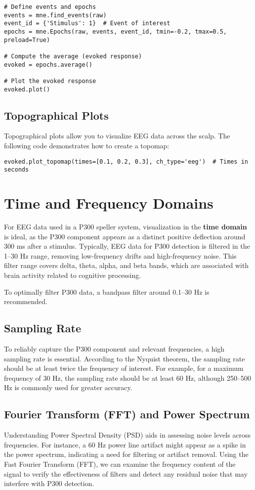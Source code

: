 \documentclass{article}
\begin{document}
\begin{verbatim}
# Define events and epochs
events = mne.find_events(raw)
event_id = {'Stimulus': 1}  # Event of interest
epochs = mne.Epochs(raw, events, event_id, tmin=-0.2, tmax=0.5, preload=True)

# Compute the average (evoked response)
evoked = epochs.average()

# Plot the evoked response
evoked.plot()
\end{verbatim}

\subsection{Topographical Plots}
Topographical plots allow you to visualize EEG data across the scalp. The following code demonstrates how to create a topomap:

\begin{verbatim}
evoked.plot_topomap(times=[0.1, 0.2, 0.3], ch_type='eeg')  # Times in seconds
\end{verbatim}


\section{Time and Frequency Domains}
For EEG data used in a P300 speller system, visualization in the \textbf{time domain} is ideal, as the P300 component appears as a distinct positive deflection around 300 ms after a stimulus. Typically, EEG data for P300 detection is filtered in the 1–30 Hz range, removing low-frequency drifts and high-frequency noise. This filter range covers delta, theta, alpha, and beta bands, which are associated with brain activity related to cognitive processing.

To optimally filter P300 data, a bandpass filter around 0.1–30 Hz is recommended.

\subsection{Sampling Rate}
To reliably capture the P300 component and relevant frequencies, a high sampling rate is essential. According to the Nyquist theorem, the sampling rate should be at least twice the frequency of interest. For example, for a maximum frequency of 30 Hz, the sampling rate should be at least 60 Hz, although 250–500 Hz is commonly used for greater accuracy.

\subsection{Fourier Transform (FFT) and Power Spectrum}
Understanding Power Spectral Density (PSD) aids in assessing noise levels across frequencies. For instance, a 60 Hz power line artifact might appear as a spike in the power spectrum, indicating a need for filtering or artifact removal. Using the Fast Fourier Transform (FFT), we can examine the frequency content of the signal to verify the effectiveness of filters and detect any residual noise that may interfere with P300 detection.
\end{document}
